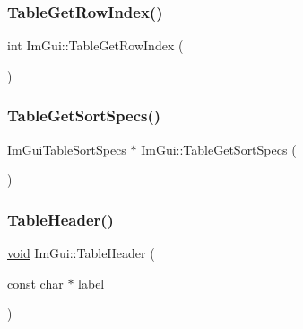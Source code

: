 \mbox{\label{namespaceImGui_a1b93e609ccd69d923f69751c25ac2f5c}} 
\subsubsection{\texorpdfstring{Table\+Get\+Row\+Index()}{TableGetRowIndex()}}
{\footnotesize\ttfamily int Im\+Gui\+::\+Table\+Get\+Row\+Index (\begin{DoxyParamCaption}{ }\end{DoxyParamCaption})}

\mbox{\label{namespaceImGui_acaeb2f2896b8332e108b6b1ce1c08fcc}} 
\subsubsection{\texorpdfstring{Table\+Get\+Sort\+Specs()}{TableGetSortSpecs()}}
{\footnotesize\ttfamily \hyperlink{structImGuiTableSortSpecs}{Im\+Gui\+Table\+Sort\+Specs} $\ast$ Im\+Gui\+::\+Table\+Get\+Sort\+Specs (\begin{DoxyParamCaption}{ }\end{DoxyParamCaption})}

\mbox{\label{namespaceImGui_ae51bc07bc518779f58def3c0e2d0045c}} 
\subsubsection{\texorpdfstring{Table\+Header()}{TableHeader()}}
{\footnotesize\ttfamily \hyperlink{imgui__impl__opengl3__loader_8h_ac668e7cffd9e2e9cfee428b9b2f34fa7}{void} Im\+Gui\+::\+Table\+Header (\begin{DoxyParamCaption}\item[{const char $\ast$}]{label }\end{DoxyParamCaption})}

\mbox{\label{namespaceImGui_a0c16791f4620e8db38511553d5d63335}} 
